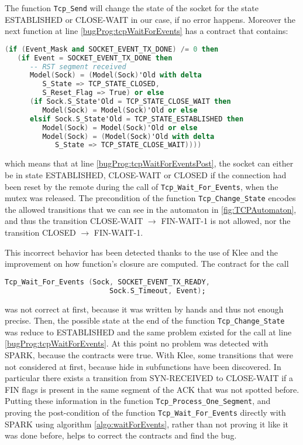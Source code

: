 \documentclass[a4paper, 10pt]{article}
\let\state\textsf
\newcommand\ESTABLISHED{\state{ESTABLISHED}}
\newcommand\SYNRECEIVED{\state{SYN-RECEIVED}}
\newcommand\CLOSED{\state{CLOSED}}
\newcommand\CLOSEWAIT{\state{CLOSE-WAIT}}
\newcommand\FINWAITONE{\state{FIN-WAIT-1}}
\begin{document}
    The function \lstinline[language=Ada]{Tcp_Send} will change the state of the socket for
    the state \ESTABLISHED{} or \CLOSEWAIT{} in our case, if no error happens. Moreover the next
    function at line \ref{bugProg:tcpWaitForEvents} has a contract that contains:
    \begin{lstlisting}[language=Ada, basicstyle=\ttfamily\small]
(if (Event_Mask and SOCKET_EVENT_TX_DONE) /= 0 then
   (if Event = SOCKET_EVENT_TX_DONE then
      -- RST segment received
      Model(Sock) = (Model(Sock)'Old with delta
         S_State => TCP_STATE_CLOSED,
         S_Reset_Flag => True) or else
      (if Sock.S_State'Old = TCP_STATE_CLOSE_WAIT then
         Model(Sock) = Model(Sock)'Old or else
      elsif Sock.S_State'Old = TCP_STATE_ESTABLISHED then
         Model(Sock) = Model(Sock)'Old or else
         Model(Sock) = (Model(Sock)'Old with delta
            S_State => TCP_STATE_CLOSE_WAIT))))
    \end{lstlisting}
    which means that at line \ref{bugProg:tcpWaitForEventsPost}, the socket can either be
    in state \ESTABLISHED{}, \CLOSEWAIT{} or \CLOSED{} if the connection had been reset by the remote
    during the call of \lstinline[language=Ada]{Tcp_Wait_For_Events}, when the mutex was released.
    The precondition of the function \lstinline[language=Ada]{Tcp_Change_State} encodes the allowed
    transitions that we can see in the automaton in \ref{fig:TCPAutomaton}, and thus the transition
    \CLOSEWAIT{} $\rightarrow$ \FINWAITONE{} is not allowed, nor the transition \CLOSED{} $\rightarrow$ \FINWAITONE{}.

    This incorrect behavior has been detected thanks to the use of Klee and the improvement
    on how function's closure are computed. The contract for the call
    \begin{lstlisting}[language=Ada, basicstyle=\ttfamily\small]
    Tcp_Wait_For_Events (Sock, SOCKET_EVENT_TX_READY,
                         Sock.S_Timeout, Event);
    \end{lstlisting}
    was not correct at first, because it was written by hands and thus not enough precise.
    Then, the possible state at the end of the function \lstinline[language=Ada]{Tcp_Change_State}
    was reduce to \ESTABLISHED{} and the same problem existed for the call
    at line \ref{bugProg:tcpWaitForEvents}. At this point no problem was detected with SPARK,
    because the contracts were true. With Klee, some transitions that were not considered at first,
    because hide in subfunctions have been discovered. In particular there exists a transition from
    \SYNRECEIVED{} to \CLOSEWAIT{} if a FIN flags is present in the same segment of the ACK that was not
    spotted before. Putting these information in the function \lstinline[language=Ada]{Tcp_Process_One_Segment},
    and proving the post-condition of the function \lstinline[language=Ada]{Tcp_Wait_For_Events}
    directly with SPARK using algorithm \ref{algo:waitForEvents}, rather than not proving it like
    it was done before, helps to correct the contracts and find the bug.
    
\end{document}
